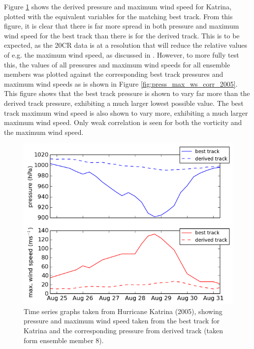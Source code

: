 \documentclass[pdftex,12pt,a4paper]{report}
\begin{document}
Figure \ref{fig:katrina_best_derived_comparison} shows the derived pressure and maximum wind speed
for Katrina, plotted with the equivalent variables for the matching best track. From this figure, it
is clear that there is far more spread in both pressure and maximum wind speed for the best
track than there is for the derived track. This is to be expected, as the 20CR data is at a
resolution that will reduce the relative values of e.g. the maximum wind speed, as discussed in
\textcite{walsh2007objectively}. However, to more fully test this, the values of all pressures and maximum wind
speeds for all ensemble members was plotted against the corresponding best track pressures and
maximum wind speeds as is shown in Figure \ref{fig:press_max_ws_corr_2005}. This figure shows that
the best track pressure is shown to vary far more than the derived track pressure, exhibiting a much
larger lowest possible value. The best track maximum wind speed is also shown to vary more,
exhibiting a much larger maximum wind speed. Only weak correlation is seen for both the vorticity
and the maximum wind speed.

\begin{figure}[hb!]
    \centering
    \includegraphics[width=\textwidth]{figures/katrina_best_derived_comparison}
    \vspace{-10pt}
    \caption{Time series graphs taken from Hurricane Katrina (2005), showing pressure and maximum
            wind speed taken from the best track for Katrina and the corresponding pressure from derived
            track (taken form ensemble member 8). }
    \label{fig:katrina_best_derived_comparison}
    \vspace{-10pt}
\end{figure}
\end{document}
